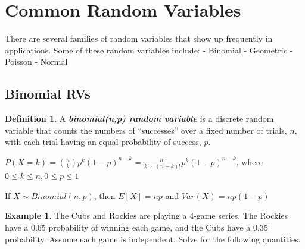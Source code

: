 \documentclass[
  11pt,
]{book}
\theoremstyle{definition}
\newtheorem{definition}{Definition}[chapter]
\theoremstyle{definition}
\newtheorem{example}{Example}[chapter]
\theoremstyle{definition}
\theoremstyle{definition}
\theoremstyle{remark}
\begin{document}
\hfill\break
\hfill\break
\hfill\break
\hfill\break
\hfill\break

\hypertarget{common-random-variables}{%
\section{Common Random Variables}\label{common-random-variables}}

There are several families of random variables that show up frequently in applications. Some of these random variables include:
- Binomial
- Geometric
- Poisson
- Normal

\hypertarget{binomial-rvs}{%
\subsection{Binomial RVs}\label{binomial-rvs}}

\begin{definition}
A \textbf{\emph{binomial(n,p) random variable}} is a discrete random variable that counts the numbers of ``successes'' over a fixed number of trials, \(n\), with each trial having an equal probability of success, \(p\).

\(P(X=k) = \binom{n}{k} p^k(1-p)^{n-k} = \frac{n!}{k!\ \cdot\ (n-k)!} p^k(1-p)^{n-k}\), where \(0 \leq k \leq n, 0 \leq p \leq 1\)

If \(X \sim Binomial(n,p)\), then \(E[X]=np\) and \(Var(X)=np(1-p)\)
\end{definition}

\begin{example}
The Cubs and Rockies are playing a 4-game series. The Rockies have a 0.65 probability of winning each game, and the Cubs have a 0.35 probability. Assume each game is independent. Solve for the following quantities.
\end{example}
\end{document}
